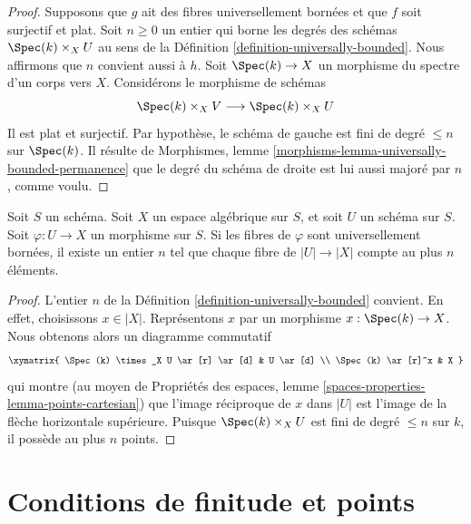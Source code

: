 \begin{proof}
Supposons que $g$ ait des fibres universellement bornées et que $f$ soit
surjectif et plat. Soit $n \geq 0$ un entier qui borne les degrés des schémas
$\Spec(k) \times_X U$ au sens de la
Définition \ref{definition-universally-bounded}.
Nous affirmons que $n$ convient aussi à $h$.
Soit $\Spec(k) \to X$ un morphisme du spectre d'un corps vers $X$.
Considérons le morphisme de schémas
$$
\Spec(k) \times_X V \longrightarrow \Spec(k) \times_X U
$$
Il est plat et surjectif. Par hypothèse, le schéma de gauche est fini de degré
$\leq n$ sur $\Spec(k)$. Il résulte de
Morphismes, lemme \ref{morphisms-lemma-universally-bounded-permanence}
que le degré du schéma de droite est lui aussi majoré par $n$, comme voulu.
\end{proof}

\begin{lemma}
\label{lemma-universally-bounded-finite-fibres}
Soit $S$ un schéma.
Soit $X$ un espace algébrique sur $S$, et soit $U$ un schéma sur $S$.
Soit $\varphi : U \to X$ un morphisme sur $S$.
Si les fibres de $\varphi$ sont universellement bornées, il existe un entier
$n$ tel que chaque fibre de $|U| \to |X|$ compte au plus $n$ éléments.
\end{lemma}

\begin{proof}
L'entier $n$ de la Définition \ref{definition-universally-bounded} convient.
En effet, choisissons $x \in |X|$. Représentons $x$ par un morphisme
$x : \Spec(k) \to X$. Nous obtenons alors un diagramme commutatif
$$
\xymatrix{
\Spec(k) \times_X U \ar[r] \ar[d] & U \ar[d] \\
\Spec(k) \ar[r]^x & X
}
$$
qui montre (au moyen de
Propriétés des espaces,
lemme \ref{spaces-properties-lemma-points-cartesian})
que l'image réciproque de $x$ dans $|U|$ est l'image de la flèche horizontale
supérieure. Puisque $\Spec(k) \times_X U$ est fini de degré $\leq n$ sur $k$,
il possède au plus $n$ points.
\end{proof}











\section{Conditions de finitude et points}
\label{section-points-monomorphisms}


